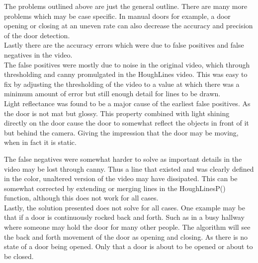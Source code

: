 \documentclass{article}
\begin{document}
The problems outlined above are just the general outline. There are many more problems which may be case specific. In manual doors for example, a door opening or closing at an uneven rate can also decrease the accuracy and precision of the door detection.\\
Lastly there are the accuracy errors which were due to false positives and false negatives in the video.\\
The false positives were mostly due to noise in the original video, which through thresholding and canny promulgated in the HoughLines video. This was easy to fix by adjusting the thresholding of the video to a value at which there was a minimum amount of error but still enough detail for lines to be drawn.\\
Light reflectance was found to be a major cause of the earliest false positives. As the door is not mat but glossy. This property combined with light shining directly on the door cause the door to somewhat reflect the objects in front of it but behind the camera. Giving the impression that the door may be moving, when in fact it is static.


The false negatives were somewhat harder to solve as important details in the video may be lost through canny. Thus a line that existed and was clearly defined in the color, unaltered version of the video may have dissipated. This can be somewhat corrected by extending or merging lines in the HoughLinesP() function, although this does not work for all cases. \\

Lastly, the solution presented does not solve for all cases. One example may be that if a door is continuously rocked back and forth. Such as in a busy hallway where someone may hold the door for many other people. The algorithm will see the back and forth movement of the door as opening and closing. As there is no state of a door being opened. Only that a door is about to be opened or about to be closed.\\









\pagebreak
\end{document}
